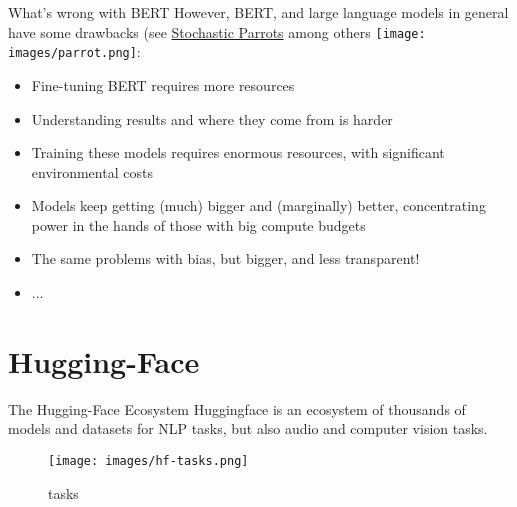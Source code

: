 \documentclass[
  10pt,
  ignorenonframetext,
  aspectratio=169]{beamer}
\begin{document}
\begin{frame}{What's wrong with BERT}
\protect\hypertarget{whats-wrong-with-bert}{}
However, BERT, and large language models in general have some drawbacks
(see \href{https://dl.acm.org/doi/10.1145/3442188.3445922}{Stochastic
Parrots} among others \texttt{[image: images/parrot.png]}:

\begin{itemize}
  \item<1->Fine-tuning BERT requires more resources
  \item<2->Understanding results and where they come from is harder
  \item<3->Training these models requires enormous resources, with significant environmental costs
  \item<4->Models keep getting (much) bigger and (marginally) better, concentrating power in the hands of those with big compute budgets
  \item<5->The same problems with bias, but bigger, and less transparent!
  \item<6->...
\end{itemize}
\end{frame}

\hypertarget{hugging-face}{%
\section{Hugging-Face}\label{hugging-face}}

\begin{frame}{The Hugging-Face Ecosystem}
\protect\hypertarget{the-hugging-face-ecosystem}{}
Huggingface is an ecosystem of thousands of models and datasets for NLP
tasks, but also audio and computer vision tasks.

\begin{figure}
\centering
\texttt{[image: images/hf-tasks.png]}
\caption{tasks}
\end{figure}
\end{frame}
\end{document}
